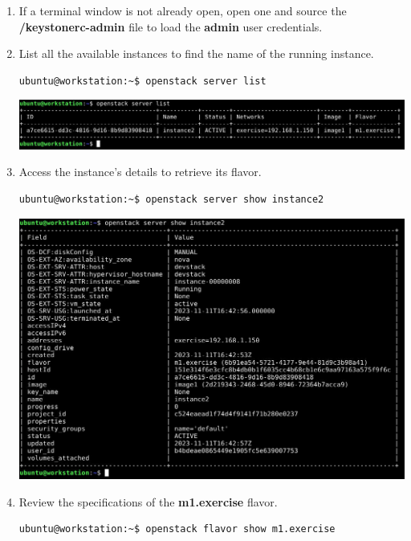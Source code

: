 \documentclass[letterpaper, 12pt]{article}
\begin{document}
\begin{enumerate}
    \item If a terminal window is not already open, open one and source the \textbf{\texttildemid/keystonerc-admin} file
    to load the \textbf{admin} user credentials.

    \item List all the available instances to find the name of the running instance.
\begin{lstlisting}
ubuntu@workstation:~$ openstack server list
\end{lstlisting}

    \begin{center}
        \includegraphics[width=\linewidth]{images/part5/step2.png}
    \end{center}

    \item Access the instance's details to retrieve its flavor.
\begin{lstlisting}
ubuntu@workstation:~$ openstack server show instance2
\end{lstlisting}

    \begin{center}
        \includegraphics[width=\linewidth]{images/part5/step3.png}
    \end{center}

    \item Review the specifications of the \textbf{m1.exercise} flavor.
\begin{lstlisting}
ubuntu@workstation:~$ openstack flavor show m1.exercise
\end{lstlisting}


\end{enumerate}
\end{document}
